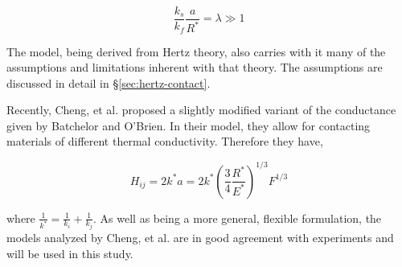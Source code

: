 \begin{equation}
	\frac{ k_s }{ k_f } \frac{a}{R^*} = \lambda \gg 1
\end{equation}

The model, being derived from Hertz theory, also carries with it many of the assumptions and limitations inherent with that theory. The assumptions are discussed in detail in \S\ref{sec:hertz-contact}.

Recently, Cheng, et al.\cite{Cheng19994199} proposed a slightly modified variant of the conductance given by Batchelor and O'Brien. In their model, they allow for contacting materials of different thermal conductivity. Therefore they have,

\begin{equation}
	H_{ij} = 2k^*a = 2k^* \left(\frac{3}{4}\frac{R^*}{E^*}\right)^{1/3}F^{1/3}
\end{equation}

where $\frac{1}{k^*} = \frac{1}{k_i} + \frac{1}{k_j}$. As well as being a more general, flexible formulation, the models analyzed by Cheng, et al.\cite{Cheng19994199} are in good agreement with experiments and will be used in this study.